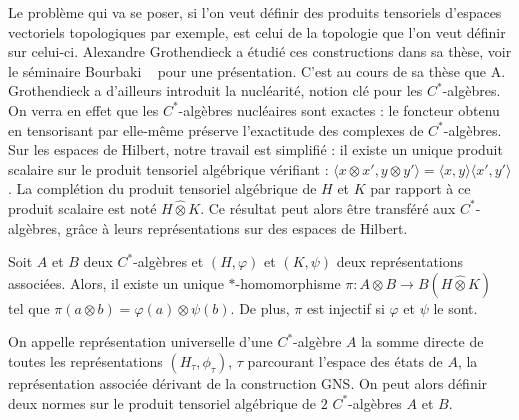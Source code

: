 Le problème qui va se poser, si l'on veut définir des produits tensoriels d'espaces vectoriels topologiques par exemple, est celui de la topologie que l'on veut définir sur celui-ci. Alexandre Grothendieck a étudié ces constructions dans sa thèse, voir le séminaire Bourbaki ~\cite{GrothendieckNuc} pour une présentation. C'est au cours de sa thèse que A. Grothendieck a d'ailleurs introduit la nucléarité, notion clé pour les $C^*$-algèbres. On verra en effet que les $C^*$-algèbres nucléaires sont exactes : le foncteur obtenu en tensorisant par elle-même préserve l'exactitude des complexes de $C^*$-algèbres.\\

Sur les espaces de Hilbert, notre travail est simplifié : il existe un unique produit scalaire sur le produit tensoriel algébrique vérifiant : $\langle x\otimes x', y\otimes y'\rangle=\langle x, y\rangle \langle x',y' \rangle$. La complétion du produit tensoriel algébrique de $H$ et $K$ par rapport à ce produit scalaire est noté $H\hat \otimes K$. Ce résultat peut alors être transféré aux $C^*$-algèbres, grâce à leurs représentations sur des espaces de Hilbert. 

\begin{prop}
Soit $A$ et $B$ deux $C^*$-algèbres et $(H,\varphi)$ et $(K,\psi)$ deux représentations associées. Alors, il existe un unique $*$-homomorphisme $\pi : A\otimes B \rightarrow B(H\hat\otimes K)$ tel que $\pi(a\otimes b)= \varphi(a)\otimes \psi(b)$. De plus, $\pi$ est injectif si $\varphi$ et $\psi$ le sont.
\end{prop} 

On appelle représentation universelle d'une $C^*$-algèbre $A$ la somme directe de toutes les représentations $(H_\tau,\phi_\tau)$, $\tau$ parcourant l'espace des états de $A$, la représentation associée dérivant de la construction GNS. On peut alors définir deux normes sur le produit tensoriel algébrique de $2$ $C^*$-algèbres $A$ et $B$.

